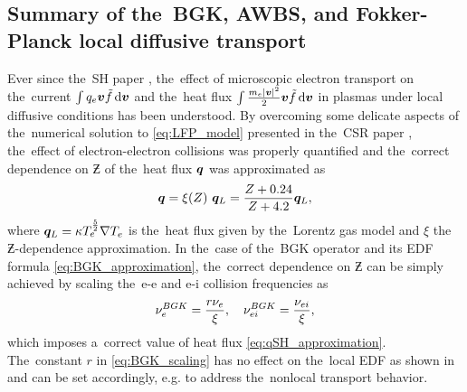 
\subsection{Summary of the~BGK, AWBS, and Fokker-Planck local diffusive 
transport}
\label{sec:SummaryDiffusiveKinetics}

Ever since the~SH paper \cite{SpitzerHarm_PR1953}, the~effect of microscopic
electron transport on the~current $\int q_e \boldsymbol{v} \tilde{f} \, \text{d}\boldsymbol{v}$ 
and the~heat flux $\int \frac{m_e |\boldsymbol{v}|^2}{2} \boldsymbol{v} \tilde{f} \, \text{d}\boldsymbol{v}$ 
in plasmas
under local diffusive conditions has been understood. By overcoming some 
delicate aspects of the~numerical solution to \eqref{eq:LFP_model} presented 
in the~CSR paper \cite{CSR_1950}, the~effect of electron-electron collisions
was properly quantified and the~correct dependence on $\Zbar$ of the~heat flux
$\boldsymbol{q}$ was approximated as \cite{SpitzerHarm_PR1953, Epperlein_PoFB1991} 
\begin{equation}
  \boldsymbol{q} = \xi(Z)~\boldsymbol{q}_L 
  = \frac{Z + 0.24}{Z + 4.2} \boldsymbol{q}_L ,
  \label{eq:qSH_approximation}
\end{equation}
where $\boldsymbol{q}_L = \kappa T_e^{\frac{5}{2}}\nabla T_e$ is the~heat flux given 
by the~Lorentz gas model \cite{Lorentz_1905} and 
$\xi$ the~$\Zbar$-dependence approximation. In the~case of the~BGK operator 
and its EDF formula \eqref{eq:BGK_approximation}, the~correct dependence on 
$\Zbar$ can be simply achieved by scaling the~e-e and e-i collision 
frequencies as
\begin{equation}
  \nu_{e}^{BGK} = \frac{r\nu_{e}}{\xi},\quad \nu_{ei}^{BGK} = \frac{\nu_{ei}}{\xi}
   ,
  \label{eq:BGK_scaling}
\end{equation}
which imposes a~correct value of heat flux \eqref{eq:qSH_approximation}. 
The~constant $r$ in \eqref{eq:BGK_scaling} has no effect on the~local EDF as
shown in  %
and can be set accordingly, e.g. to address the~nonlocal transport behavior.

